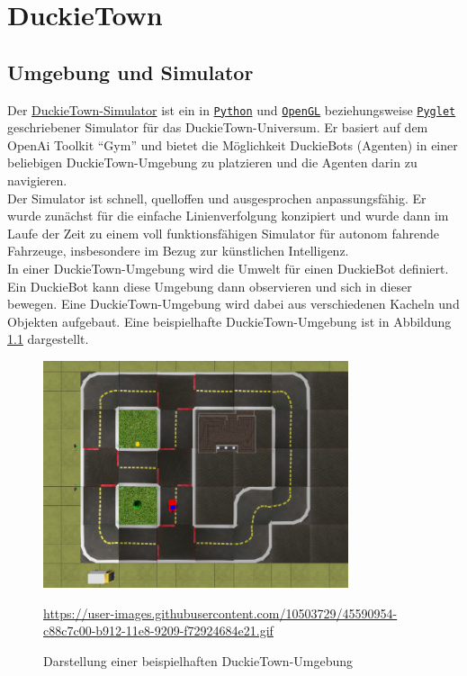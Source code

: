 \chapter{DuckieTown}

\section{Umgebung und Simulator}


Der \href{https://github.com/duckietown/gym-duckietown}{DuckieTown-Simulator} ist ein in \href{https://www.python.org/}{\texttt{Python}} und \href{https://www.opengl.org/}{\texttt{OpenGL}} beziehungsweise \href{http://pyglet.org/}{\texttt{Pyglet}} geschriebener Simulator für das \glqq DuckieTown-Universum\grqq. Er basiert auf dem OpenAi Toolkit ``Gym'' \cite{gym} und bietet die Möglichkeit DuckieBots (Agenten) in einer beliebigen DuckieTown-Umgebung zu platzieren und die Agenten darin zu navigieren. \cite{gym_duckietown} \\

Der Simulator ist schnell, quelloffen und ausgesprochen anpassungsfähig. Er wurde zunächst für die einfache Linienverfolgung konzipiert und wurde dann im Laufe der Zeit zu einem voll funktionsfähigen Simulator für autonom fahrende Fahrzeuge, insbesondere im Bezug zur künstlichen Intelligenz. \cite{gym_duckietown} \\

In einer DuckieTown-Umgebung wird die Umwelt für einen DuckieBot definiert. Ein DuckieBot kann diese Umgebung dann observieren und sich in dieser bewegen. Eine DuckieTown-Umgebung wird dabei aus verschiedenen Kacheln und Objekten aufgebaut. Eine beispielhafte DuckieTown-Umgebung ist in Abbildung \ref{duckietown-env} dargestellt.

\begin{figure}[H]
	\centering
	\includegraphics[width=0.8\textwidth]{kapitel2/images/duckietown-umgebung.png}
	\caption{Darstellung einer beispielhaften DuckieTown-Umgebung}
	\label{duckietown-env}
	\vspace{0.2cm}
	\quelle\url{https://user-images.githubusercontent.com/10503729/45590954-c88c7c00-b912-11e8-9209-f72924684e21.gif}
\end{figure}

